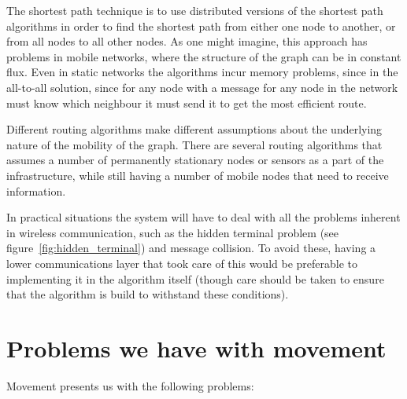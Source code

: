 \documentclass[letter, 12pt, english, draft]{article}
\begin{document}
\begin{description}
{The shortest path technique is to use distributed versions of the shortest path algorithms in order to find the shortest path from either one node to another, or from all nodes to all other nodes. As one might imagine, this approach has problems in mobile networks, where the structure of the graph can be in constant flux. Even in static networks the algorithms incur memory problems, since in the all-to-all solution, since for any node with a message for any node in the network must know which neighbour it must send it to get the most efficient route.}
{}  

\end{description}

Different routing algorithms make different assumptions about the underlying nature of the mobility of the graph. There are several routing algorithms \cite{adaptive, two-tier} that assumes a number of permanently stationary nodes or sensors as a part of the infrastructure, while still having a number of mobile nodes that need to receive information. 


In practical situations the system will have to deal with all the problems inherent in wireless communication, such as the hidden terminal problem (see figure~\ref{fig:hidden_terminal}) and message collision. To avoid these, having a lower communications layer that took care of this would be preferable to implementing it in the algorithm itself (though care should be taken to ensure that the algorithm is build to withstand these conditions).

\section{Problems we have with movement}

Movement presents us with the following problems:

\end{document}
